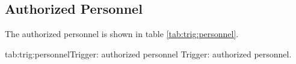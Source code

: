 \begin{safetyen}{10}{15}
\subsection{Authorized  Personnel} 
\end{safetyen}
The authorized personnel is shown in table \ref{tab:trig:personnel}.
\begin{namestab}{tab:trig:personnel}{Trigger: authorized personnel}{%
      Trigger: authorized personnel.}
  \AlexandreCamsonne{}
\end{namestab}

%
%
%
%
%
%
%
%
%
%
